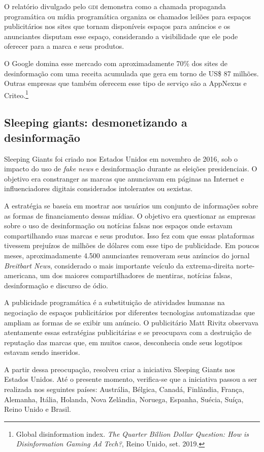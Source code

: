 O relatório divulgado pelo \textsc{gdi} demonstra como a chamada propaganda
programática ou mídia programática organiza os chamados leilões para
espaços publicitários nos sites que tornam disponíveis espaços para
anúncios e os anunciantes disputam esse espaço, considerando a
visibilidade que ele pode oferecer para a marca e seus produtos.

O Google domina esse mercado com aproximadamente 70\% dos sites de
desinformação com uma receita acumulada que gera em torno de US\$ 87
milhões. Outras empresas que também oferecem esse tipo de serviço são a
AppNexus e Criteo.\footnote{Global disinformation index. \textit{The Quarter Billion Dollar
Question: How is Disinformation Gaming Ad Tech?}, Reino Unido, set. 2019.}

\subsection{Sleeping giants: desmonetizando a desinformação}

Sleeping Giants foi criado nos Estados Unidos em novembro de 2016, sob o
impacto do uso de \textit{fake news} e desinformação durante as eleições
presidenciais. O objetivo era constranger as marcas que anunciavam em
páginas na Internet e influenciadores digitais considerados intolerantes
ou sexistas.

A estratégia se baseia em mostrar aos usuários um conjunto de
informações sobre as formas de financiamento dessas mídias. O objetivo
era questionar as empresas sobre o uso de desinformação ou notícias
falsas nos espaços onde estavam compartilhando suas marcas e seus
produtos. Isso fez com que essas plataformas tivessem prejuízos de
milhões de dólares com esse tipo de publicidade. Em poucos meses,
aproximadamente 4.500 anunciantes removeram seus anúncios do jornal
\textit{Breitbart News}, considerado o mais importante veículo da extrema-direita norte-americana, um dos maiores compartilhadores de mentiras,
notícias falsas, desinformação e discurso de ódio.

A publicidade programática é a substituição de atividades humanas na
negociação de espaços publicitários por diferentes tecnologias
automatizadas que ampliam as formas de se exibir um anúncio. O
publicitário Matt Rivitz observava atentamente essas estratégias
publicitárias e se preocupava com a destruição de reputação das marcas
que, em muitos casos, desconhecia onde seus logotipos estavam sendo
inseridos.

A partir dessa preocupação, resolveu criar a iniciativa Sleeping Giants
nos Estados Unidos. Até o presente momento, verifica-se que a iniciativa
passou a ser realizada nos seguintes países: Austrália, Bélgica,
Canadá, Finlândia, França, Alemanha, Itália, Holanda, Nova Zelândia,
Noruega, Espanha, Suécia, Suíça, Reino Unido e Brasil.


